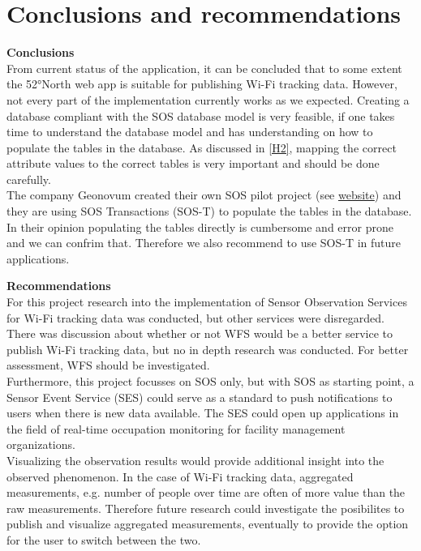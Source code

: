 \chapter{Conclusions and recommendations}
\textbf{Conclusions}\\
From current status of the application, it can be concluded that to some extent 
the 52°North web app is suitable for publishing Wi-Fi tracking data. However, 
not every part of the implementation currently works as we expected. Creating a 
database compliant with the SOS database model is very feasible, if one takes 
time to understand the database model and has understanding on how to populate 
the tables in the database. As discussed in \autoref{H2}, mapping the correct 
attribute values to the correct tables is very important and should be done 
carefully.\\
The company Geonovum created their own SOS pilot project (see \href{http://sospilot.readthedocs.io/en/latest/}{website}) 
and they are using SOS Transactions (SOS-T) to populate the tables in the 
database. In their opinion populating the tables directly is cumbersome and 
error prone and we can confrim that. Therefore we also recommend to use 
SOS-T in future applications.

\textbf{Recommendations}\\
For this project research into the implementation of Sensor Observation 
Services for Wi-Fi tracking data was conducted, but other services were 
disregarded. There was discussion about whether or not WFS would be a better 
service to publish Wi-Fi tracking data, but no in depth research was conducted. 
For better assessment, WFS should be investigated.\\
Furthermore, this project focusses on SOS only, but with SOS as starting point, 
a Sensor Event Service (SES) could serve as a standard to push notifications to 
users when there is new data available. The SES could open up applications in 
the field of real-time occupation monitoring for facility management 
organizations.\\
Visualizing the observation results would provide additional insight into the 
observed phenomenon. In the case of Wi-Fi tracking data, aggregated 
measurements, e.g. number of people over time are often of more value than the 
raw measurements. Therefore future research could investigate the posibilites 
to publish and visualize aggregated measurements, eventually to provide the 
option for the user to switch between the two.


